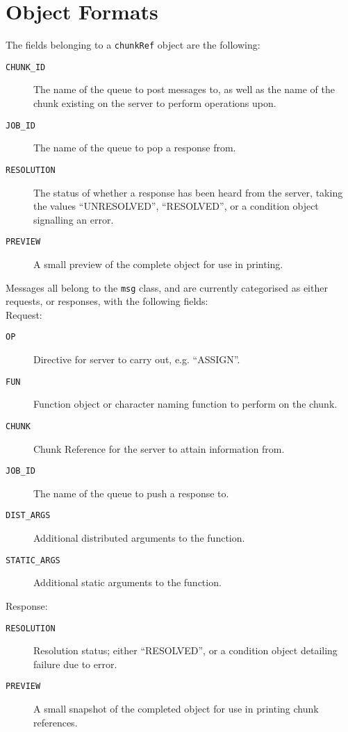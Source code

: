 \documentclass[a4paper,10pt]{article}
\begin{document}
\newpage
\section{Object Formats}
The fields belonging to a \texttt{chunkRef} object are the following:
\begin{description}
	\item[\texttt{CHUNK\_ID}] The name of the queue to post messages to, as
		well as the name of the chunk existing on the server to perform
		operations upon.
	\item[\texttt{JOB\_ID}] The name of the queue to pop a response from.
	\item[\texttt{RESOLUTION}] The status of whether a response has been
		heard from the server, taking the values ``UNRESOLVED'',
		``RESOLVED'', or a condition object signalling an error.
	\item[\texttt{PREVIEW}] A small preview of the complete object for use
		in printing.
\end{description}

Messages all belong to the \texttt{msg} class, and are currently categorised as
either requests, or responses, with the following fields:\\

Request:
\begin{description}
	\item[\texttt{OP}] Directive for server to carry out, e.g. ``ASSIGN''.
	\item[\texttt{FUN}] Function object or character naming function to
		perform on the chunk.
	\item[\texttt{CHUNK}] Chunk Reference for the server to attain
		information from.
	\item[\texttt{JOB\_ID}] The name of the queue to push a response to.
	\item[\texttt{DIST\_ARGS}] Additional distributed arguments to the
		function.
	\item[\texttt{STATIC\_ARGS}] Additional static arguments to the
		function.
\end{description}

Response:
\begin{description}
	\item[\texttt{RESOLUTION}] Resolution status; either ``RESOLVED'', or a
		condition object detailing failure due to error.
	\item[\texttt{PREVIEW}]  A small snapshot of the completed object for
		use in printing chunk references.
\end{description}
\end{document}
